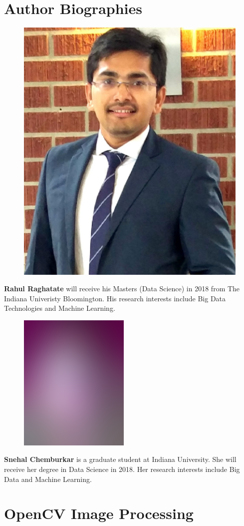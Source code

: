 \documentclass[9pt,twocolumn,twoside]{../../styles/osajnl}
\begin{document}
\section*{Author Biographies}
\begingroup \setlength\intextsep{0pt}
\begin{minipage}[t][3.2cm][t]{1.0\columnwidth}
  \begin{figure}
    \includegraphics[width=0.25\columnwidth]{images/rahul_thumbnail.jpg}
  \end{figure}
  \noindent
  {\bfseries Rahul Raghatate} will receive his Masters (Data Science)
  in 2018 from The Indiana Univeristy Bloomington. His research
  interests include Big Data Technologies and Machine Learning.
\end{minipage}
\begin{minipage}[t][3.2cm][t]{1.0\columnwidth} %
  \begin{figure}
    \includegraphics[width=0.25\columnwidth]{images/alice_smith.eps}
  \end{figure}
  \noindent
  {\bfseries Snehal Chemburkar} is a graduate student at Indiana
  University. She will receive her degree in Data Science in 2018. Her
  research interests include Big Data and Machine Learning.
\end{minipage}
\endgroup \appendix

\section{OpenCV Image Processing}
\end{document}
